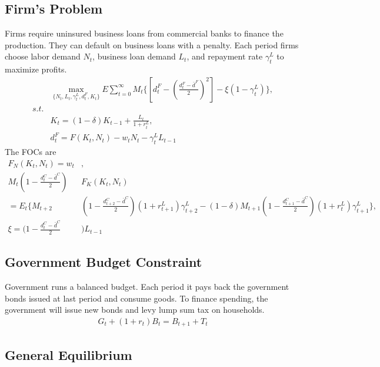 \documentclass[12pt]{article}
\begin{document}
\subsection{Firm's Problem}
Firms require uninsured business loans from commercial banks to finance the production. They can default on business loans with a penalty. Each period firms choose 
labor demand $N_t$, business loan demand $L_t$, and repayment rate $\gamma_t^L$ to maximize profits. 
\begin{align}
  &\max_{\{N_t, L_t, \gamma_t^L, d_t^F, K_t\}} E \sum_{t=0}^{\infty} M_t\{[d_t^F-(\frac{d_t^F-\bar{d}^F}{2})^2]-\xi(1-\gamma_t^L)\} ,\\
  s.t. \nonumber \\
  &K_t=(1-\delta)K_{t-1}+\frac{L_t}{1+r_t^L}, \\
  &d_t^F=F(K_t, N_t)-w_tN_t-\gamma_t^L L_{t-1}
\end{align}
The FOCs are 
\begin{align}
  F_N(K_t, N_t)=w_t&, \\
  M_t (1-\frac{d_t^C-\bar{d}^C}{2})&F_K(K_t, N_t) \nonumber \\
  = E_t \bigg\{ M_{t+2} &(1-\frac{d_{t+2}^C-\bar{d}^C}{2} )(1+r_{t+1}^L)\gamma_{t+2}^L
  -(1-\delta)M_{t+1} (1 -\frac{d_{t+1}^C-\bar{d}^C}{2})(1+r_t^L)\gamma_{t+1}^L \bigg\}, \\
  \xi = (1-\frac{d_t^C-\bar{d}^C}{2} &)L_{t-1}
\end{align}


\subsection{Government Budget Constraint}
Government runs a balanced budget. Each period it pays back the government bonds issued at last period and consume goods. 
To finance spending, the government will issue new bonds and levy lump sum tax on households.
\begin{align}
  G_t+(1+r_t)B_t=B_{t+1}+T_t
\end{align}


\subsection{General Equilibrium}
\end{document}
